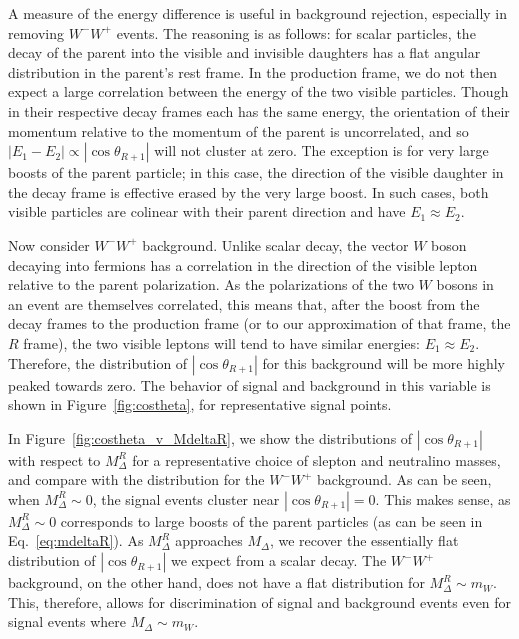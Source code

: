 A measure of the energy difference is useful in background rejection, especially in removing $W^-W^+$ events. The reasoning is as follows: for scalar particles, the decay of the parent into the visible and invisible daughters has a flat angular distribution in the parent's rest frame. In the production frame, we do not then expect a large correlation between the energy of the two visible particles. Though in their respective decay frames each has the same energy, the orientation of their momentum relative to the momentum of the parent is uncorrelated, and so $|E_1 - E_2| \propto |\cos\theta_{R+1}|$ will not cluster at zero. The exception is for very large boosts of the parent particle; in this case, the direction of the visible daughter in the decay frame is effective erased by the very large boost. In such cases, both visible particles are colinear with their parent direction and have $E_1 \approx E_2$.

Now consider $W^-W^+$ background. Unlike scalar decay, the vector $W$ boson decaying into fermions has a correlation in the direction of the visible lepton relative to the parent polarization. As the polarizations of the two $W$ bosons in an event are themselves correlated, this means that, after the boost from the decay frames to the production frame (or to our approximation of that frame, the $R$ frame), the two visible leptons will tend to have similar energies: $E_1 \approx E_2$. Therefore, the distribution of $|\cos\theta_{R+1}|$ for this background will be more highly peaked towards zero. The behavior of signal and background in this variable is shown in Figure~\ref{fig:costheta}, for representative signal points.


In Figure~\ref{fig:costheta_v_MdeltaR}, we show the distributions of $|\cos\theta_{R+1}|$ with respect to $M_\Delta^R$ for a representative choice of slepton and neutralino masses, and compare with the distribution for the $W^-W^+$ background. As can be seen, when $M_\Delta^R \sim 0$, the signal events cluster near $|\cos\theta_{R+1}| = 0$. This makes sense, as $M_\Delta^R \sim 0$ corresponds to large boosts of the parent particles (as can be seen in Eq.~\eqref{eq:mdeltaR}). As $M_\Delta^R$ approaches $M_\Delta$, we recover the essentially flat distribution of $|\cos\theta_{R+1}|$ we expect from a scalar decay. The $W^-W^+$ background, on the other hand, does not have a flat distribution for $M_\Delta^R \sim m_W$. This, therefore, allows for discrimination of signal and background events even for signal events where $M_\Delta \sim m_W$.

